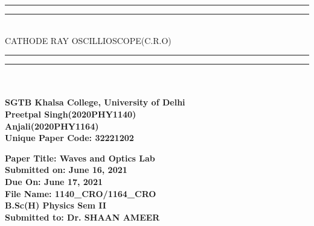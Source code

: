 \documentclass{article}
\begin{document}
\begin{center}
\rule{\textwidth}{1.6pt}\vspace*{-\baselineskip}\vspace*{2pt} %
\rule{\textwidth}{0.4pt}\\[\baselineskip] %

{\LARGE CATHODE RAY OSCILLIOSCOPE(C.R.O) }%

\rule{\textwidth}{0.4pt}\vspace*{-\baselineskip}\vspace{3.2pt} %
\rule{\textwidth}{1.6pt}\\[2\baselineskip] %




\textbf{\Large \\[\baselineskip] SGTB Khalsa College, University of Delhi}\\[\baselineskip]
\textbf{\Large Preetpal Singh(2020PHY1140) \\[\baselineskip] Anjali(2020PHY1164)}\\[\baselineskip] 

\vspace*{\baselineskip}
\textbf{\Large Unique Paper Code: 32221202}\\[\baselineskip] 
\vspace*{\baselineskip}
 
\textbf{\Large Paper Title: Waves and Optics Lab}\\[\baselineskip] 
\vspace*{\baselineskip}
\textbf{\Large Submitted on: June 16, 2021}\\[\baselineskip] 
\vspace*{\baselineskip}
\textbf{\Large Due On: June 17, 2021}\\[\baselineskip] 
\vspace*{\baselineskip}
\textbf{\Large File Name: 1140\_CRO/1164\_CRO}\\[\baselineskip]
\vspace*{\baselineskip}
\textbf{\Large B.Sc(H) Physics Sem II}\\[\baselineskip] 
\vspace*{\baselineskip}
\vspace*{\baselineskip}
\textbf{\Large Submitted to: Dr. SHAAN AMEER}\\[\baselineskip] 


\end{center}
\newpage
\end{document}
